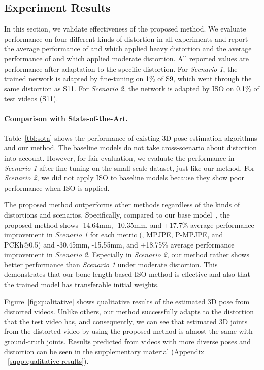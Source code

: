     \subsection{Experiment Results}
        \label{sec:experiment results}
        \vspace{-1mm}
        In this section, we validate effectiveness of the proposed method. We evaluate performance on four different kinds of distortion in all experiments and report the average performance of  and  which applied heavy distortion and the average performance of  and  which applied moderate distortion. All reported values are performance after adaptation to the specific distortion. For \textit{Scenario 1}, the trained network is adapted by fine-tuning on 1\% of S9, which went through the same distortion as S11. For \textit{Scenario 2}, the network is adapted by ISO on 0.1\% of test videos (S11).
        \vspace{-3mm}
        \vspace{-2mm}
        \paragraph{Comparison with State-of-the-Art.}
            Table~\ref{tbl:sota} shows the performance of existing 3D pose estimation algorithms and our method. The baseline models do not take cross-scenario about distortion into account. However, for fair evaluation, we evaluate the performance in \textit{Scenario 1} after fine-tuning on the small-scale dataset, just like our method. For \textit{Scenario 2}, we did not apply ISO to baseline models because they show poor performance when ISO is applied.
        
            The proposed method outperforms other methods regardless of the kinds of distortions and scenarios. Specifically, compared to our base model~\cite{ref9_pavllo20193d}, the proposed method shows -14.64mm, -10.35mm, and +17.7\% average performance improvement in \textit{Scenario 1} for each metric (\ie, MPJPE, P-MPJPE, and PCKh@0.5) and -30.45mm, -15.55mm, and +18.75\% average performance improvement in \textit{Scenario 2}. Especially in \textit{Scenario 2}, our method rather shows better performance than \textit{Scenario 1} under moderate distortion. This demonstrates that our bone-length-based ISO method is effective and also that the trained model has transferable initial weights.
        
            Figure~\ref{fig:qualitative} shows qualitative results of the estimated 3D pose from distorted videos. Unlike others, our method successfully adapts to the distortion that the test video has, and consequently, we can see that estimated 3D joints from the distorted video by using the proposed method is almost the same with ground-truth joints. Results predicted from videos with more diverse poses and distortion can be seen in the supplementary material (Appendix ~\ref{supp:qualitative results}).

